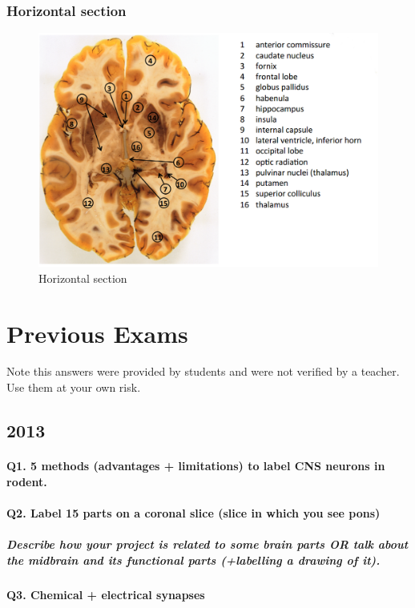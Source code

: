 \documentclass[12pt,article,oneside,a4paper]{memoir}
\begin{document}
\subsubsection{Horizontal section}
\begin{figure}[H]
	\centering
  	\includegraphics[width=\linewidth]{imgs/horizontal-section-answer.png}
	\caption{Horizontal section}
  	\label{fig:horizontalSection-answer}
\end{figure}

\newpage
\section{Previous Exams}
Note this answers were provided by students and were not verified by a teacher. Use them at your own risk.

\subsection{2013}
\paragraph{Q1. 5 methods (advantages + limitations) to label CNS neurons in rodent.}
\paragraph{Q2. Label 15 parts on a coronal slice (slice in which you see pons)}
\subparagraph{Describe how your project is related to some brain parts OR talk about the midbrain and its functional parts (+labelling a drawing of it).}
\paragraph{Q3. Chemical + electrical synapses}
\end{document}
